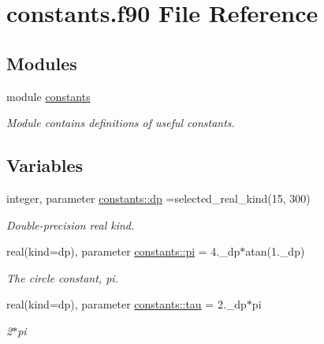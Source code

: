 \hypertarget{constants_8f90}{}\section{constants.\+f90 File Reference}
\label{constants_8f90}
\subsection*{Modules}
\begin{DoxyCompactItemize}
\item 
module \hyperlink{namespaceconstants}{constants}
\begin{DoxyCompactList}\small\item\em Module contains definitions of useful constants. \end{DoxyCompactList}\end{DoxyCompactItemize}
\subsection*{Variables}
\begin{DoxyCompactItemize}
\item 
integer, parameter \hyperlink{namespaceconstants_a1a28a6edcc3cd14a0b8ca99f0a5d4e2c}{constants\+::dp} =selected\+\_\+real\+\_\+kind(15, 300)
\begin{DoxyCompactList}\small\item\em Double-\/precision real kind. \end{DoxyCompactList}\item 
real(kind=dp), parameter \hyperlink{namespaceconstants_a6b3bd07bfab41d9c44a226e58a25abb2}{constants\+::pi} = 4.\+\_\+dp$\ast$atan(1.\+\_\+dp)
\begin{DoxyCompactList}\small\item\em The circle constant, pi. \end{DoxyCompactList}\item 
real(kind=dp), parameter \hyperlink{namespaceconstants_a55d6f125a01979f87b18c4128c21cab3}{constants\+::tau} = 2.\+\_\+dp$\ast$pi
\begin{DoxyCompactList}\small\item\em 2$\ast$pi \end{DoxyCompactList}\end{DoxyCompactItemize}
